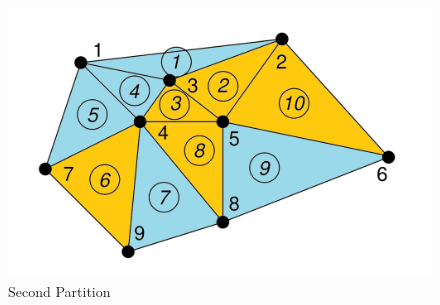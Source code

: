 \documentclass{article}
\begin{document}
\begin{enumerate}[label=(\alph*)]
    \begin{figure}[h]
    \centering
     \includegraphics[scale=0.3]{zweite Zerlegung}
    \caption{Second Partition}
    \label{fig:meine-grafik2}
    \end{figure}


\end{enumerate}
\end{document}
